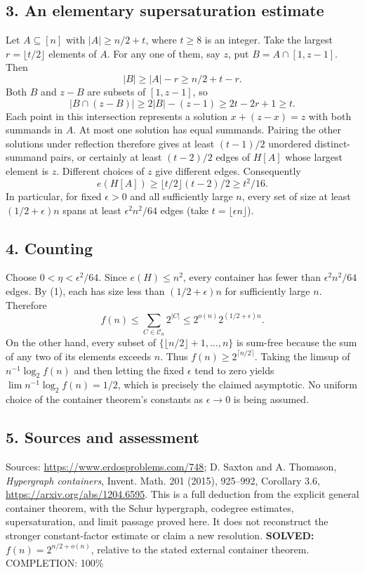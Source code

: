 \subsection*{3. An elementary supersaturation estimate}
Let $A\subseteq[n]$ with $|A|\ge n/2+t$, where $t\ge8$ is an integer. Take the largest $r=\lfloor t/2\rfloor$ elements of $A$. For any one of them, say $z$, put $B=A\cap[1,z-1]$. Then
\[
 |B|\ge |A|-r\ge n/2+t-r.
\]
Both $B$ and $z-B$ are subsets of $[1,z-1]$, so
\[
 |B\cap(z-B)|\ge2|B|-(z-1)\ge2t-2r+1\ge t.
\]
Each point in this intersection represents a solution $x+(z-x)=z$ with both summands in $A$. At most one solution has equal summands. Pairing the other solutions under reflection therefore gives at least $(t-1)/2$ unordered distinct-summand pairs, or certainly at least $(t-2)/2$ edges of $H[A]$ whose largest element is $z$. Different choices of $z$ give different edges. Consequently
\[
 e(H[A])\ge\lfloor t/2\rfloor(t-2)/2\ge t^2/16. \tag{1}
\]
In particular, for fixed $\epsilon>0$ and all sufficiently large $n$, every set of size at least $(1/2+\epsilon)n$ spans at least $\epsilon^2 n^2/64$ edges (take $t=\lfloor\epsilon n\rfloor$).
\subsection*{4. Counting}
Choose $0<\eta<\epsilon^2/64$. Since $e(H)\le n^2$, every container has fewer than $\epsilon^2n^2/64$ edges. By (1), each has size less than $(1/2+\epsilon)n$ for sufficiently large $n$. Therefore
\[
 f(n)\le\sum_{C\in\mathcal C_n}2^{|C|}
 \le2^{o(n)}2^{(1/2+\epsilon)n}.
\]
On the other hand, every subset of $\{\lfloor n/2\rfloor+1,\ldots,n\}$ is sum-free because the sum of any two of its elements exceeds $n$. Thus $f(n)\ge2^{\lceil n/2\rceil}$.
Taking the limsup of $n^{-1}\log_2f(n)$ and then letting the fixed $\epsilon$ tend to zero yields $\lim n^{-1}\log_2 f(n)=1/2$, which is precisely the claimed asymptotic. No uniform choice of the container theorem's constants as $\epsilon\to0$ is being assumed.
\subsection*{5. Sources and assessment}
Sources: \url{https://www.erdosproblems.com/748}; D. Saxton and A. Thomason, \emph{Hypergraph containers}, Invent. Math. 201 (2015), 925--992, Corollary 3.6, \url{https://arxiv.org/abs/1204.6595}.
This is a full deduction from the explicit general container theorem, with the Schur hypergraph, codegree estimates, supersaturation, and limit passage proved here. It does not reconstruct the stronger constant-factor estimate or claim a new resolution.
\textbf{SOLVED:} $f(n)=2^{n/2+o(n)}$, relative to the stated external container theorem.
\noindent COMPLETION: 100\%

